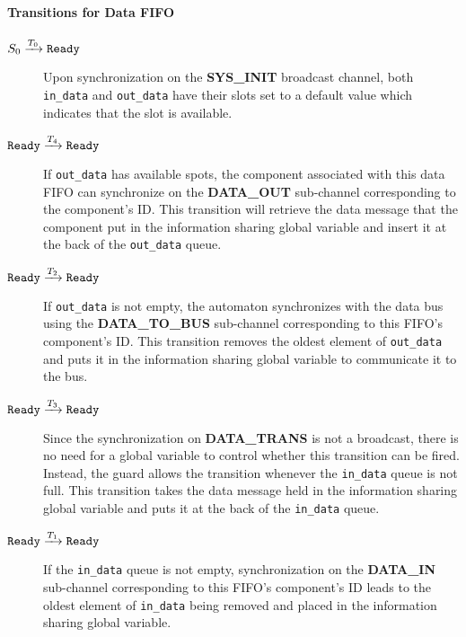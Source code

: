 \paragraph{Transitions for Data FIFO}
\begin{description}
\item[$S_0 \xrightarrow[]{T_{0}} \texttt{Ready}$]
   Upon synchronization on the \textbf{SYS\_INIT} broadcast channel, both
   \lstinline!in_data! and \lstinline!out_data! have their slots set to a
   default value which indicates that the slot is available.

\item[$\texttt{Ready} \xrightarrow[]{T_{4}} \texttt{Ready}$]
   If \lstinline!out_data! has available spots, the component associated with
   this data FIFO can synchronize on the \textbf{DATA\_OUT} sub-channel
   corresponding to the component's ID. This transition will retrieve
   the data message that the component put in the information sharing global
   variable and insert it at the back of the \lstinline!out_data! queue.

\item[$\texttt{Ready} \xrightarrow[]{T_{2}} \texttt{Ready}$]
   If \lstinline!out_data! is not empty, the automaton synchronizes with the
   data bus using the \textbf{DATA\_TO\_BUS} sub-channel corresponding to this
   FIFO's component's ID. This transition removes the oldest element of
   \lstinline!out_data! and puts it in the information sharing global variable
   to communicate it to the bus.

\item[$\texttt{Ready} \xrightarrow[]{T_{3}} \texttt{Ready}$]
   Since the synchronization on \textbf{DATA\_TRANS} is not a broadcast, there
   is no need for a global variable to control whether this transition can be
   fired. Instead, the guard allows the transition whenever the
   \lstinline!in_data! queue is not full. This transition takes the data message
   held in the information sharing global variable and puts it at the back of
   the \lstinline!in_data! queue.

\item[$\texttt{Ready} \xrightarrow[]{T_{1}} \texttt{Ready}$]
   If the \lstinline!in_data! queue is not empty, synchronization on the
   \textbf{DATA\_IN} sub-channel corresponding to this FIFO's component's ID
   leads to the oldest element of \lstinline!in_data! being removed and
   placed in the information sharing global variable.
\end{description}
